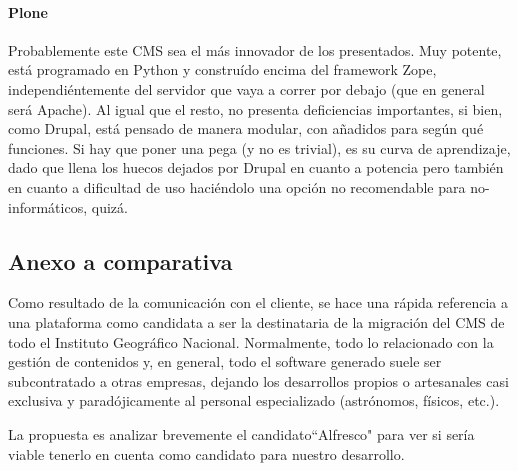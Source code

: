 \paragraph{Plone}
\par Probablemente este CMS sea el más innovador de los presentados. Muy potente, está programado en Python y construído encima del framework Zope, independiéntemente del servidor que vaya a correr por debajo (que en general será Apache).
Al igual que el resto, no presenta deficiencias importantes, si bien, como Drupal, está pensado de manera modular, con añadidos para según qué funciones.
Si hay que poner una pega (y no es trivial), es su curva de aprendizaje, dado que llena los huecos dejados por Drupal en cuanto a potencia pero también en cuanto a dificultad de uso haciéndolo una opción no recomendable para no-informáticos, quizá.

\subsection{Anexo a comparativa}
\par Como resultado de la comunicación con el cliente, se hace una rápida referencia a una plataforma como candidata a ser la destinataria de la migración del CMS de todo el Instituto Geográfico Nacional. Normalmente, todo lo relacionado con la gestión de contenidos y, en general, todo el software generado suele ser subcontratado a otras empresas, dejando los desarrollos propios o artesanales casi exclusiva y paradójicamente al personal especializado (astrónomos, físicos, etc.).
\par La propuesta es analizar brevemente el candidato``Alfresco" para ver si sería viable tenerlo en cuenta como candidato para nuestro desarrollo.
